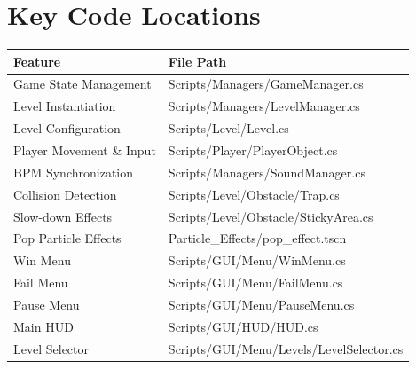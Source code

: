 \documentclass{report}
\begin{document}
\section{Key Code Locations}
\begin{longtable}{|l|l|}
	\hline
	\textbf{Feature}              & \textbf{File Path}                    \\
	\hline
	Game State Management         & Scripts/Managers/GameManager.cs       \\
	\hline
	Level Instantiation           & Scripts/Managers/LevelManager.cs      \\
	\hline
	Level Configuration           & Scripts/Level/Level.cs                \\
	\hline
	Player Movement \& Input      & Scripts/Player/PlayerObject.cs        \\
	\hline
	BPM Synchronization           & Scripts/Managers/SoundManager.cs      \\
	\hline
	Collision Detection           & Scripts/Level/Obstacle/Trap.cs        \\
	\hline
	Slow-down Effects             & Scripts/Level/Obstacle/StickyArea.cs  \\
	\hline
	Pop Particle Effects          & Particle\_Effects/pop\_effect.tscn    \\
	\hline
	Win Menu                      & Scripts/GUI/Menu/WinMenu.cs           \\
	\hline
	Fail Menu                     & Scripts/GUI/Menu/FailMenu.cs          \\
	\hline
	Pause Menu                    & Scripts/GUI/Menu/PauseMenu.cs         \\
	\hline
	Main HUD                      & Scripts/GUI/HUD/HUD.cs                \\
	\hline
	Level Selector                & Scripts/GUI/Menu/Levels/LevelSelector.cs \\
	\hline
\end{longtable}

% 
% 
\end{document}

